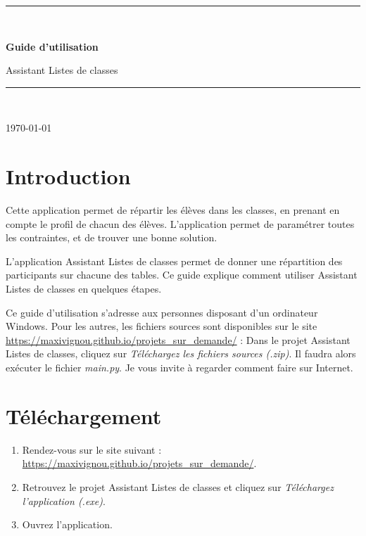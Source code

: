 \documentclass[11pt,a4paper]{article}
\newcommand{\nomproduit}{Assistant Listes de classes}
\begin{document}
\begin{titlepage}
  \centering
  \vspace*{4cm}
  {\color{principale}\rule{\linewidth}{1.5pt}}\\[0.8cm]
  {\Huge\bfseries\color{principale} Guide d'utilisation\par}
  \vspace{0.5cm}
  {\LARGE \nomproduit\par}
  \vspace{0.4cm}
  {\color{principale}\rule{\linewidth}{1.5pt}}\\[2cm]
  {\large \today\par}
\end{titlepage}

\tableofcontents
\clearpage

\section{Introduction}
\label{sec:introduction}
Cette application permet de répartir les élèves dans les classes, en prenant en compte le profil de chacun des élèves. L'application permet de paramétrer toutes les contraintes, et de trouver une bonne solution.

L'application \nomproduit{} permet de donner une répartition des participants sur chacune des tables.
Ce guide explique comment utiliser \nomproduit{} en quelques étapes.

\begin{note}
Ce guide d'utilisation s'adresse aux personnes disposant d'un ordinateur Windows. Pour les autres, les fichiers sources sont disponibles sur le site \url{https://maxivignou.github.io/projets_sur_demande/} : Dans le projet \nomproduit{}, cliquez sur \textit{Téléchargez les fichiers sources (.zip)}. Il faudra alors exécuter le fichier \textit{main.py}. Je vous invite à regarder comment faire sur Internet.
\end{note}

\section{Téléchargement}
\label{sec:telechargement}
\begin{enumerate}
  \item Rendez-vous sur le site suivant : \url{https://maxivignou.github.io/projets_sur_demande/}.
  \item Retrouvez le projet \nomproduit{} et cliquez sur \textit{Téléchargez l'application (.exe)}.
  \item Ouvrez l'application.
\end{enumerate}
\end{document}
